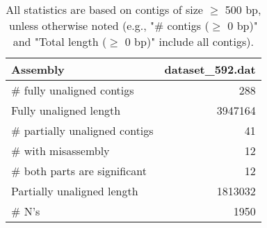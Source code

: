 \documentclass[12pt,a4paper]{article}
\begin{document}
\begin{table}[ht]
\begin{center}
\caption{All statistics are based on contigs of size $\geq$ 500 bp, unless otherwise noted (e.g., "\# contigs ($\geq$ 0 bp)" and "Total length ($\geq$ 0 bp)" include all contigs).}
\begin{tabular}{|l*{1}{|r}|}
\hline
Assembly & dataset\_592.dat \\ \hline
\# fully unaligned contigs & 288 \\ \hline
Fully unaligned length & 3947164 \\ \hline
\# partially unaligned contigs & 41 \\ \hline
\hspace{5mm}\# with misassembly & 12 \\ \hline
\hspace{5mm}\# both parts are significant & 12 \\ \hline
Partially unaligned length & 1813032 \\ \hline
\# N's & 1950 \\ \hline
\end{tabular}
\end{center}
\end{table}
\end{document}

